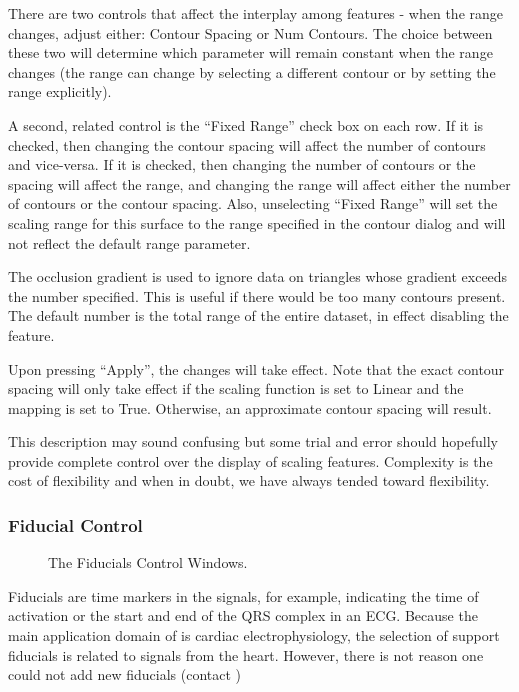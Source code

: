 There are two controls that affect the interplay among features - when the range
changes, adjust either: Contour Spacing or Num Contours.
The choice between these two will determine which
parameter will remain constant when the range changes (the range can change
by selecting a different contour or by setting the range explicitly).

A second, related control is the ``Fixed Range'' check box on each row.
If it is checked, then changing the contour spacing will affect the number
of contours and vice-versa.  If it is checked, then changing the number
of contours or the spacing will affect the range, and changing the range
will affect either the number of contours or the contour spacing.  Also,
unselecting ``Fixed Range'' will set the scaling range for this surface
to the range specified in the contour dialog and will not reflect the
default range parameter.

The occlusion gradient is used to ignore data on triangles whose gradient
exceeds the number specified.  This is useful if there would be too many
contours present.  The default number is the total range of the entire dataset,
in effect disabling the feature.

Upon pressing ``Apply'', the changes will take effect.  Note that
the exact contour spacing will only take effect if the scaling function is 
set to Linear and the mapping is set to True.  Otherwise, an approximate 
contour spacing will result. 

This description may sound confusing but some trial and error should
hopefully provide complete control over the display of scaling features.
Complexity is the cost of flexibility and when in doubt, we have always
tended toward flexibility. 



\subsubsection{Fiducial Control}
\label{sec:fiducialswindow}

\begin{figure}[htb]
  \begin{makeimage}
  \end{makeimage}
  \fiducialswindow
  \caption{\label{fig:fid1} The Fiducials Control Windows.}
\end{figure}

Fiducials are time markers in the signals, for
example, indicating the time of activation or the start and end of the QRS
complex in an ECG.  Because the main application domain of \map{} is
cardiac electrophysiology, the selection of support fiducials is related to
signals from the heart.  However, there is not reason one could not add new
fiducials (contact \rob{}) 

